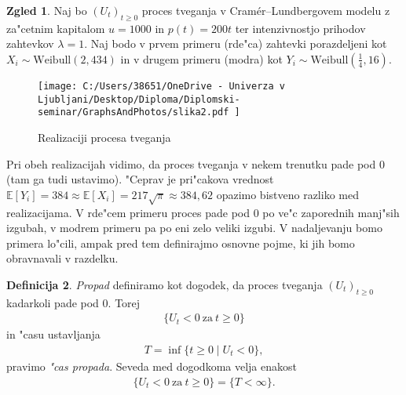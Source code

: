 \documentclass[12pt, a4paper, reqno]{amsart}
\theoremstyle{definition}
\newtheorem{definicija}{Definicija}[section]
\newtheorem{zgled}[definicija]{Zgled}
\theoremstyle{plain}
\newcommand{\E}{\mathbb{E}}
\newcommand{\1}{\mathds{1}}
\begin{document}
        \begin{zgled}
            Naj bo $(U_t)_{t\geq0}$ proces tveganja v Cramér--Lundbergovem modelu z za"cetnim kapitalom
            $u = 1000$ in $p(t) = 200t$ ter intenzivnostjo prihodov zahtevkov $\lambda=1$. %
            Naj bodo v prvem primeru (rde"ca) 
            zahtevki porazdeljeni kot $X_i \sim \text{Weibull}(2, 434)$ in v drugem primeru (modra) kot
            $Y_i \sim \text{Weibull}(\tfrac{1}{4}, 16)$.
            
            \begin{figure}[H]
                \centering
                \texttt{[image: 
                    C:/Users/38651/OneDrive - Univerza v Ljubljani/Desktop/Diploma/Diplomski-seminar/GraphsAndPhotos/slika2.pdf
                    ]}
                \caption{Realizaciji procesa tveganja}
                \label{fig:slika3}
            \end{figure}

            \noindent
            Pri obeh realizacijah vidimo, da proces tveganja v nekem trenutku pade pod $0$ (tam ga 
            tudi ustavimo). "Ceprav je pri"cakova vrednost 
            $\E\left[Y_i\right] = 384 \approx \E\left[X_i\right] = 217\sqrt{\pi} \approx 384{,}62$ 
            opazimo bistveno razliko med realizacijama. V rde"cem primeru proces pade pod
            $0$ po ve"c zaporednih manj"sih izgubah, v modrem primeru pa po eni zelo veliki izgubi. 
            V nadaljevanju bomo primera lo"cili, ampak pred tem 
            definirajmo osnovne pojme, ki jih bomo obravnavali v razdelku.

            \label{zgd:weibullProcesTveganja}
        \end{zgled}

        \begin{definicija}
            \textit{Propad} definiramo kot dogodek, da proces tveganja $(U_t)_{t\geq0}$ kadarkoli pade pod $0$. 
            Torej 
            \begin{align*}
                \bigl\{U_t<0 \ \text{za} \ t\geq 0\bigr\}
            \end{align*}
            in "casu ustavljanja
            \begin{align*}
                T = \inf\{t\geq0 \mid U_t < 0\}, 
            \end{align*}
            pravimo \textit{"cas propada}. Seveda med dogodkoma velja enakost
            \begin{align*}
                \{U_t<0 \ \text{za} \ t\geq0\} = \{T<\infty\}.
            \end{align*}
            \label{def:PropadCasPropada} 
        \end{definicija}
\end{document}
